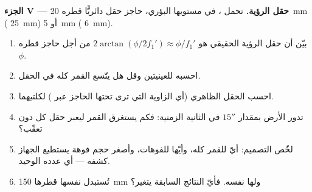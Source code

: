 \begin{problem}
\medskip
\noindent\textbf{الجزء V --- حقل الرؤية.}
تحمل ، في مستويها البؤري، حاجز حقل دائريًّا قطره
\qty{20}{mm} ( \qty{25}{mm}) أو \qty{5}{mm}
( \qty{6}{mm}).
\begin{enumerate}[resume]
  \item بيّن أن حقل الرؤية الحقيقي هو $2\arctan(\phi/2f_1')
        \approx \phi/f_1'$ من أجل حاجز قطره $\phi$.
  \item احسبه للعينيتين وقل هل يتّسع القمر كله
        في الحقل.
  \item احسب الحقل الظاهري (أي الزاوية التي ترى 
        تحتها الحاجز عبر ) لكلتيهما.
  \item تدور الأرض بمقدار $15''$ في الثانية الزمنية: فكم يستغرق
        القمر ليعبر حقل كل  دون تعقّب؟
  \item لخّص التصميم: أيّ  للقمر كله، وأيّها
        للفوهات، وأصغر حجم فوهة يستطيع الجهاز كشفه
        --- أي عدده الوحيد.
  \item تُستبدل  نفسها  قطرها \qty{150}{mm}
        ولها  نفسه. فأيّ النتائج السابقة يتغير؟
\end{enumerate}
\end{problem}

